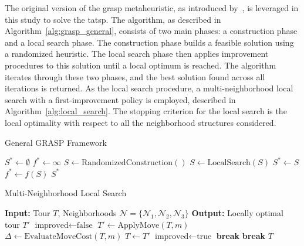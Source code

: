 \documentclass[twocolumn, switch]{article} %
\begin{document}
The original version of the \gls{grasp} metaheuristic, as introduced by~\cite{Feo1995}, is leveraged in this study to solve the \gls{tatsp}. 
The algorithm, as described in Algorithm~\ref{alg:grasp_general}, consists of two main phases: a construction phase and a local search phase.
The construction phase builds a feasible solution using a randomized heuristic. The local search phase then applies improvement procedures to this solution until a local optimum is reached.
The algorithm iterates through these two phases, and the best solution found across all iterations is returned.
As the local search procedure, a multi-neighborhood local search with a first-improvement policy is employed, described in Algorithm~\ref{alg:local_search}.
The stopping criterion for the local search is the local optimality with respect to all the neighborhood structures considered.

\begin{algorithm}
\caption{General GRASP Framework}
\label{alg:grasp_general}
\begin{algorithmic}[1]
\State $S^* \leftarrow \emptyset$ 
\State $f^* \leftarrow \infty$ 
    \State $S \leftarrow \text{RandomizedConstruction}()$
    \State $S \leftarrow \text{LocalSearch}(S)$
        \State $S^* \leftarrow S$
        \State $f^* \leftarrow f(S)$
    \EndIf
\EndFor
\State \Return $S^*$
\end{algorithmic}
\end{algorithm}


\begin{algorithm}
\caption{Multi-Neighborhood Local Search}
\label{alg:local_search}
\begin{algorithmic}[1]
\State \textbf{Input:} Tour $T$, Neighborhoods $\mathcal{N} = \{\mathcal{N}_1, \mathcal{N}_2, \mathcal{N}_3\}$
\State \textbf{Output:} Locally optimal tour $T'$
\Repeat
    \State $\text{improved} \leftarrow \text{false}$
            \State $T' \leftarrow \text{ApplyMove}(T, m)$
            \State $\Delta \leftarrow \text{EvaluateMoveCost}(T, m)$ 
                \State $T \leftarrow T'$
                \State $\text{improved} \leftarrow \text{true}$
                \State \textbf{break} 
            \EndIf
        \EndFor
            \State \textbf{break} 
        \EndIf
    \EndFor
{}
\State \Return $T$
\end{algorithmic}
\end{algorithm}
\end{document}
